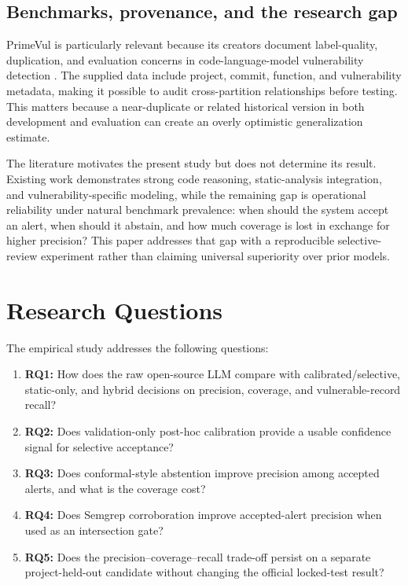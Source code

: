 \documentclass[pdflatex,sn-mathphys-num]{sn-jnl}
\begin{document}
\subsection{Benchmarks, provenance, and the research gap}

PrimeVul is particularly relevant because its creators document label-quality, duplication, and evaluation concerns in code-language-model vulnerability detection \cite{Ding2024PrimeVul}. The supplied data include project, commit, function, and vulnerability metadata, making it possible to audit cross-partition relationships before testing. This matters because a near-duplicate or related historical version in both development and evaluation can create an overly optimistic generalization estimate.

The literature motivates the present study but does not determine its result. Existing work demonstrates strong code reasoning, static-analysis integration, and vulnerability-specific modeling, while the remaining gap is operational reliability under natural benchmark prevalence: when should the system accept an alert, when should it abstain, and how much coverage is lost in exchange for higher precision? This paper addresses that gap with a reproducible selective-review experiment rather than claiming universal superiority over prior models.

\section{Research Questions}\label{sec:rqs}

The empirical study addresses the following questions:
\begin{enumerate}[leftmargin=*]
\item \textbf{RQ1:} How does the raw open-source LLM compare with calibrated/selective, static-only, and hybrid decisions on precision, coverage, and vulnerable-record recall?
\item \textbf{RQ2:} Does validation-only post-hoc calibration provide a usable confidence signal for selective acceptance?
\item \textbf{RQ3:} Does conformal-style abstention improve precision among accepted alerts, and what is the coverage cost?
\item \textbf{RQ4:} Does Semgrep corroboration improve accepted-alert precision when used as an intersection gate?
\item \textbf{RQ5:} Does the precision--coverage--recall trade-off persist on a separate project-held-out candidate without changing the official locked-test result?
\end{enumerate}
\end{document}
